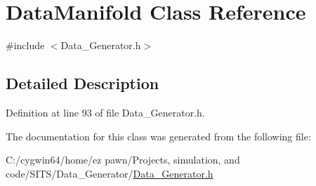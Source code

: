 \hypertarget{class_data_manifold}{}\section{Data\+Manifold Class Reference}
\label{class_data_manifold}


{\ttfamily \#include $<$Data\+\_\+\+Generator.\+h$>$}



\subsection{Detailed Description}


Definition at line 93 of file Data\+\_\+\+Generator.\+h.



The documentation for this class was generated from the following file\+:\begin{DoxyCompactItemize}
\item 
C\+:/cygwin64/home/ez pawn/\+Projects, simulation, and code/\+S\+I\+T\+S/\+Data\+\_\+\+Generator/\hyperlink{_data___generator_8h}{Data\+\_\+\+Generator.\+h}\end{DoxyCompactItemize}
